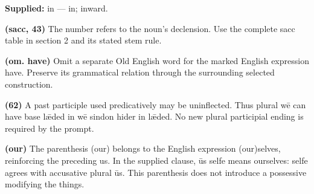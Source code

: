 \textbf{Supplied:} in — in; inward.

\textbf{(sacc, 43)} The number refers to the noun’s declension. Use the complete sacc table in section 2 and its stated stem rule.

\textbf{(om. have)} Omit a separate Old English word for the marked English expression have. Preserve its grammatical relation through the surrounding selected construction.

\textbf{(62)} A past participle used predicatively may be uninflected. Thus plural wē can have base lǣded in wē sindon hider in lǣded. No new plural participial ending is required by the prompt.

\textbf{(our)} The parenthesis (our) belongs to the English expression (our)selves, reinforcing the preceding us. In the supplied clause, ūs selfe means ourselves: selfe agrees with accusative plural ūs. This parenthesis does not introduce a possessive modifying the things.

